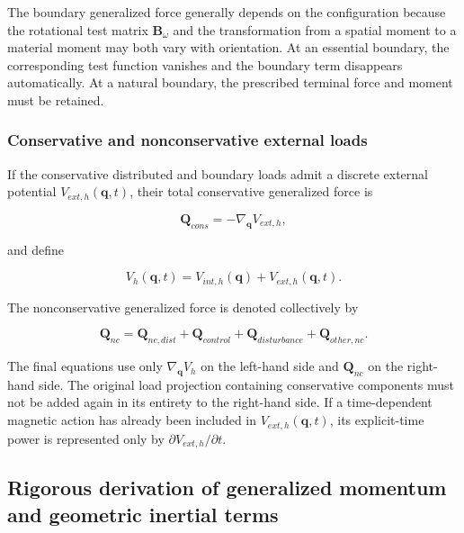 The boundary generalized force generally depends on the configuration because the rotational test matrix \(\mathbf{B}_{\omega}\) and the transformation from a spatial moment to a material moment may both vary with orientation. At an essential boundary, the corresponding test function vanishes and the boundary term disappears automatically. At a natural boundary, the prescribed terminal force and moment must be retained.

\subsubsection{Conservative and nonconservative external loads}\label{sec:galerkin-2-5-5}

If the conservative distributed and boundary loads admit a discrete external potential \(V_{ext,h}\left( \mathbf{q},t \right)\), their total conservative generalized force is

\begin{equation}
\label{eq:galerkin-2-79}
\mathbf{Q}_{cons} = - \nabla_{\mathbf{q}}V_{ext,h},
\end{equation}

and define

\begin{equation}
\label{eq:galerkin-2-80}
V_{h}\left( \mathbf{q},t \right) = V_{int,h}\left( \mathbf{q} \right) + V_{ext,h}\left( \mathbf{q},t \right).
\end{equation}

The nonconservative generalized force is denoted collectively by

\begin{equation}
\label{eq:galerkin-2-81}
\mathbf{Q}_{nc} = \mathbf{Q}_{nc,dist} + \mathbf{Q}_{control} + \mathbf{Q}_{disturbance} + \mathbf{Q}_{other,nc}.
\end{equation}

The final equations use only \(\nabla_{\mathbf{q}}V_{h}\) on the left-hand side and \(\mathbf{Q}_{nc}\) on the right-hand side. The original load projection containing conservative components must not be added again in its entirety to the right-hand side. If a time-dependent magnetic action has already been included in \(V_{ext,h}\left( \mathbf{q},t \right)\), its explicit-time power is represented only by \(\partial V_{ext,h}/\partial t\).

\subsection{Rigorous derivation of generalized momentum and geometric inertial terms}\label{sec:galerkin-2-6}

